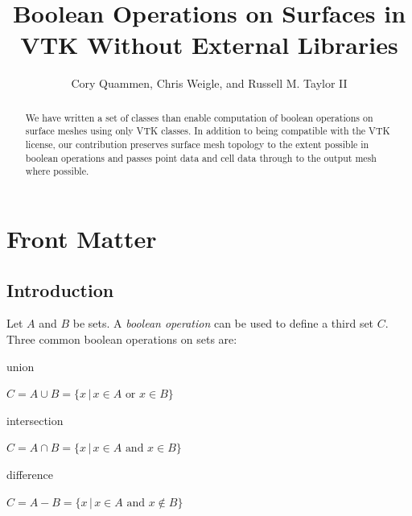 \documentclass{InsightArticle}
\title{Boolean Operations on Surfaces in VTK Without External Libraries}
\author{Cory Quammen, Chris Weigle, and Russell M. Taylor II}
\newcommand{\IJhandlerIDnumber}{3262}
\begin{document}
%
% 
\IJhandlefooter{\IJhandlerIDnumber}


\ifpdf
\else
\fi


\maketitle


\ifhtml
\chapter*{Front Matter\label{front}}
\fi


\begin{abstract}
\noindent
We have written a set of classes than enable computation of boolean operations on surface meshes using only VTK classes. In addition to being compatible with the VTK license, our contribution preserves surface mesh topology to the extent possible in boolean operations and passes point data and cell data through to the output mesh where possible.

\end{abstract}

\IJhandlenote{\IJhandlerIDnumber}

\tableofcontents

\section{Introduction}
\label{sec:Introduction}

Let $A$ and $B$ be sets. A \emph{boolean operation} can be used to define a third set $C$. Three common boolean operations on sets are:

\begin{description}

\item union

 $C = A \cup B = \{ x \, | \, x \in A \text{ or } x \in B \}$

\item intersection

$C = A \cap B = \{ x \, | \, x \in A \text{ and } x \in B \}$

\item difference

$C = A - B = \{ x \, | \, x \in A \text{ and } x \notin B \}$

\end{description}
\end{document}
